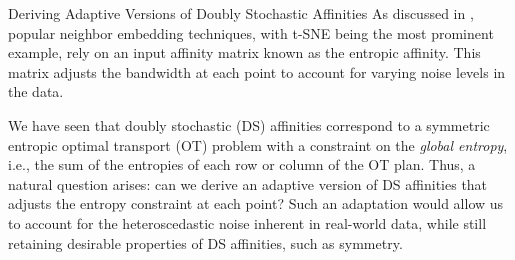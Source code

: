 \vspace{0.5cm}
\begin{prob}{Deriving Adaptive Versions of Doubly Stochastic Affinities}\label{prob:adaptive_ds}
    As discussed in , popular neighbor embedding techniques, with t-SNE being the most prominent example, rely on an input affinity matrix known as the entropic affinity. This matrix adjusts the bandwidth at each point to account for varying noise levels in the data.

    We have seen that doubly stochastic (DS) affinities correspond to a symmetric entropic optimal transport (OT) problem with a constraint on the \emph{global entropy}, i.e., the sum of the entropies of each row or column of the OT plan. Thus, a natural question arises: can we derive an adaptive version of DS affinities that adjusts the entropy constraint at each point? Such an adaptation would allow us to account for the heteroscedastic noise inherent in real-world data, while still retaining desirable properties of DS affinities, such as symmetry.
\end{prob}

\vspace{0.5cm}
